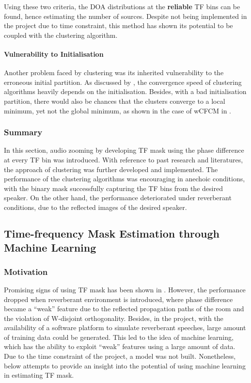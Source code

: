 \documentclass[a4paper,twoside,12pt,hidelinks]{article}
\begin{document}
Using these two criteria, the DOA distributions at the \textbf{reliable} TF bins can be found, hence estimating the number of sources. Despite not being implemented in the project due to time constraint, this method has shown its potential to be coupled with the clustering algorithm.

\paragraph{Vulnerability to Initialisation}
Another problem faced by clustering was its inherited vulnerability to the erroneous initial partition. As discussed by \cite{Arthur2006HowMethod}, the convergence speed of clustering algorithms heavily depends on the initialisation. Besides, with a bad initialisation partition, there would also be chances that the clusters converge to a local minimum, yet not the global minimum, as shown in the case of wCFCM in .

\subsubsection{Summary}
In this section, audio zooming by developing TF mask using the phase difference at every TF bin was introduced. With reference to past research and literatures, the approach of clustering was further developed and implemented. The performance of the clustering algorithms was encouraging in anechoic conditions, with the binary mask successfully capturing the TF bins from the desired speaker. On the other hand, the performance deteriorated under reverberant conditions, due to the reflected images of the desired speaker. 

\subsection{Time-frequency Mask Estimation through Machine Learning}
\subsubsection{Motivation}
Promising signs of using TF mask has been shown in . However, the performance dropped when reverberant environment is introduced, where phase difference became a ``weak'' feature due to the reflected propagation paths of the room and the violation of W-disjoint orthogonality. Besides, in the project, with the availability of a software platform to simulate reverberant speeches, large amount of training data could be generated. This led to the idea of machine learning, which has the ability to exploit ``weak'' features using a large amount of data. Due to the time constraint of the project, a model was not built. Nonetheless, below attempts to provide an insight into the potential of using machine learning in estimating TF mask.
\end{document}
